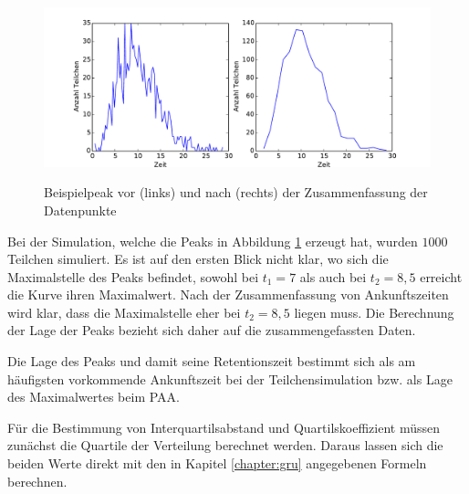 \begin{figure}
 \centering
  \includegraphics[width = \textwidth]{bilder/zeiten_zusammenfassen}\\
  \caption[Zeiten zusammenfassen]{Beispielpeak vor (links) und nach (rechts) der Zusammenfassung der Datenpunkte}
  \label{zeiten_zusammenfassen}
\end{figure}

Bei der Simulation, welche die Peaks in Abbildung \ref{zeiten_zusammenfassen} erzeugt hat, wurden $1000$ Teilchen simuliert. Es ist auf den ersten Blick nicht klar, wo sich die Maximalstelle des Peaks befindet, sowohl bei $t_1 = 7$ als auch bei $ t_2 = 8,5$ erreicht die Kurve ihren Maximalwert. Nach der Zusammenfassung von Ankunftszeiten wird klar, dass die Maximalstelle eher bei $t_2 = 8,5$ liegen muss. Die Berechnung der Lage der Peaks bezieht sich daher auf die zusammengefassten Daten.

Die Lage des Peaks und damit seine Retentionszeit bestimmt sich als am häufigsten vorkommende Ankunftszeit bei der Teilchensimulation bzw. als Lage des Maximalwertes beim PAA.

Für die Bestimmung von Interquartilsabstand und Quartilskoeffizient müssen zunächst die Quartile der Verteilung berechnet werden. Daraus lassen sich die beiden Werte direkt mit den in Kapitel \ref{chapter:gru} angegebenen Formeln berechnen. 
